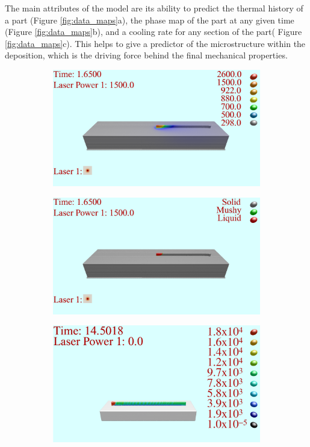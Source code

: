\documentclass[metals,article,accept,pdftex,moreauthors]{Definitions/mdpi}
\begin{document}
The main attributes of the model are its ability to predict the thermal history of a part 
(Figure \ref{fig:data_maps}a), the phase map of the part at any given time (Figure 
\ref{fig:data_maps}b), and a cooling rate for any section of the part( Figure 
\ref{fig:data_maps}c).  This helps to give a predictor of the microstructure within the 
deposition, which is the driving force behind the final mechanical properties. 

\begin{figure}[H]
\begin{subfigure}[c]{0.3\textwidth}
\includegraphics[width=\textwidth]{TEMP}
\caption{\centering \label{1a}}
\end{subfigure}
\begin{subfigure}[c]{0.3\textwidth}
\includegraphics[width=\textwidth]{PHASE}
\caption{\centering }
\end{subfigure}
\begin{subfigure}[c]{0.3\textwidth}
\includegraphics[width=\textwidth]{COOLRATE}

\end{subfigure}
\end{figure}
\end{document}
